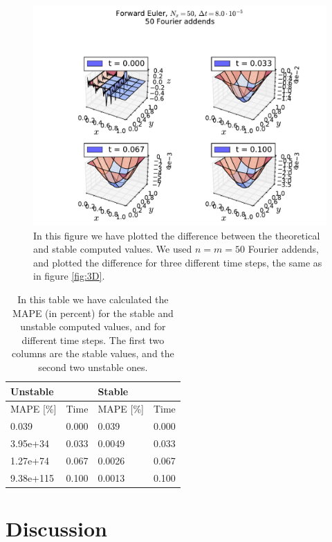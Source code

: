 \documentclass[reprint, english,notitlepage,nofootinbib]{revtex4-1}  %
\begin{document}
\begin{figure}[!htb]
	\includegraphics[width=16cm]{TwoDimensions-Nt1250-dt8_0e-05-Nx50-Error.pdf}
	\caption{In this figure we have plotted the difference between the theoretical and stable computed values. We used $n=m=50$ Fourier addends, and plotted the difference for three different time steps, the same as in figure \ref{fig:3D}.
	\label{fig:3D_error}}
\end{figure}


\begin{table}[!htb] %
	\begin{tabular}{|l|l|l|l|} \hline
		Unstable&& Stable &\\ \hline
		MAPE [\%]   & Time  & MAPE [\%]  & Time  \\ \hline
		0.039               & 0.000 & 0.039 & 0.000 \\ \hline
		3.95e+34               & 0.033 & 0.0049 & 0.033 \\ \hline
		1.27e+74               & 0.067 & 0.0026 & 0.067 \\ \hline
		9.38e+115              & 0.100 & 0.0013 & 0.100 \\ \hline
	\end{tabular}
	\caption{In this table we have calculated the MAPE (in percent) for the stable and unstable computed values, and for different time steps. The first two columns are the stable values, and the second two unstable ones.
	\label{tab:error_2D}}
\end{table}

\section{Discussion}
\end{document}
